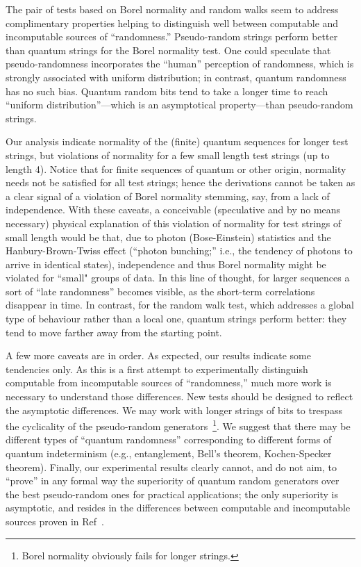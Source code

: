 \documentclass[10pt]{article}%
\begin{document}
 The pair of tests based on Borel normality and random walks seem to address complimentary properties helping to distinguish well between
 computable and incomputable sources of ``randomness.''
Pseudo-random strings perform better  than quantum strings for the Borel normality test.
 One could speculate that pseudo-randomness incorporates
the ``human'' perception of randomness, which is strongly associated with uniform distribution;
in contrast, quantum randomness has no such bias.
Quantum random bits  tend to take a longer time to reach
``uniform distribution''---which is an asymptotical property---than pseudo-random strings.


Our analysis indicate normality of the (finite) quantum sequences for longer test strings,
but violations of normality for a few small length test strings (up to length 4).
Notice that for finite sequences of quantum or other origin,
normality needs not be satisfied for all test strings;
hence the derivations cannot be taken as a clear signal of a violation of Borel normality
stemming, say, from a lack of independence.
With these caveats, a conceivable (speculative and  by no means necessary) physical explanation of this violation of normality
for test strings of small length would be that, due to photon
(Bose-Einstein) statistics and the Hanbury-Brown-Twiss effect
(``photon bunching;'' i.e., the tendency of photons to arrive in identical states), independence and thus Borel
normality might be violated for ``small" groups of data.
In this line of thought,  for larger sequences a sort of ``late randomness'' becomes visible,
as the short-term correlations disappear in time.
In contrast, for the random walk test, which addresses a global type of behaviour rather than
a local one, quantum strings perform better: they tend to  move farther away from the starting point.



A few more caveats are in order.
As expected, our results indicate some tendencies only.  As this is a first attempt to experimentally distinguish computable from incomputable sources
of ``randomness,'' much more work is necessary to understand those differences.
  New tests should be designed to reflect the asymptotic differences. We may work with  longer strings of bits to trespass the
cyclicality of the pseudo-random generators~\footnote{Borel normality obviously  fails for
longer strings.}. We suggest that there may be different types of ``quantum randomness''
corresponding to different forms of quantum indeterminism (e.g.,
entanglement, Bell's theorem, Kochen-Specker theorem).
Finally, our experimental results clearly cannot, and do not aim, to ``prove'' in any formal way  the
superiority of quantum random generators over the best pseudo-random ones for practical applications;
the only superiority is asymptotic, and resides in the differences between computable and incomputable sources proven in Ref~\cite{2008-cal-svo}.
\end{document}
